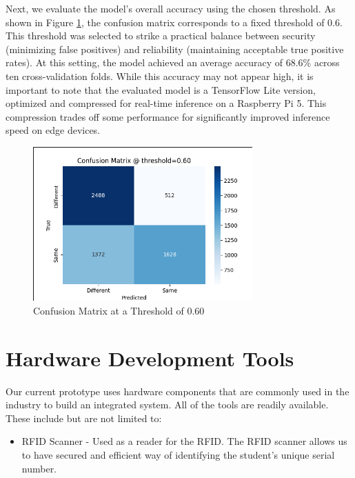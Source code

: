 \clearpage
Next, we evaluate the model's overall accuracy using the chosen threshold. As shown in Figure \ref{fig:fixed_thresh}, the confusion matrix corresponds to a fixed threshold of 0.6. This threshold was selected to strike a practical balance between security (minimizing false positives) and reliability (maintaining acceptable true positive rates). At this setting, the model achieved an average accuracy of 68.6\% across ten cross-validation folds. While this accuracy may not appear high, it is important to note that the evaluated model is a TensorFlow Lite version, optimized and compressed for real-time inference on a Raspberry Pi 5. This compression trades off some performance for significantly improved inference speed on edge devices.
\begin{figure}[h] %
	\centering
	\includegraphics[width=0.75\textwidth]{figures/chapter4/fixed_thresh_matrix.png} %
	\caption{Confusion Matrix at a Threshold of 0.60}
	\label{fig:fixed_thresh}
\end{figure}

\section{Hardware Development Tools}
Our current prototype uses hardware components that are commonly used in the industry to build an integrated system. All of the tools are readily available. These include but are not limited to:

\begin{itemize}
	\item	RFID Scanner - Used as a reader for the RFID. The RFID scanner allows us to have secured and efficient way of identifying the student's unique serial number.
	
\end{itemize}

